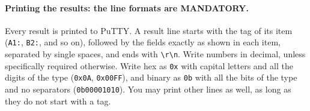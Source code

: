 \documentclass[11pt,a4paper]{article}
\begin{document}
\paragraph{Printing the results: the line formats are MANDATORY.}
Every result is printed to PuTTY. A result line starts with the tag of its item (\texttt{A1:}, \texttt{B2:}, and so
on), followed by the fields exactly as shown in each item, separated by single spaces, and ends with
\texttt{\textbackslash r\textbackslash n}. Write numbers in decimal, unless specifically required otherwise. Write hex as
\texttt{0x} with capital letters and all the digits of the type (\texttt{0x0A}, \texttt{0x00FF}), and binary as
\texttt{0b} with all the bits of the type and no separators (\texttt{0b00001010}). You may print other lines as well,
as long as they do not start with a tag.
\end{document}
